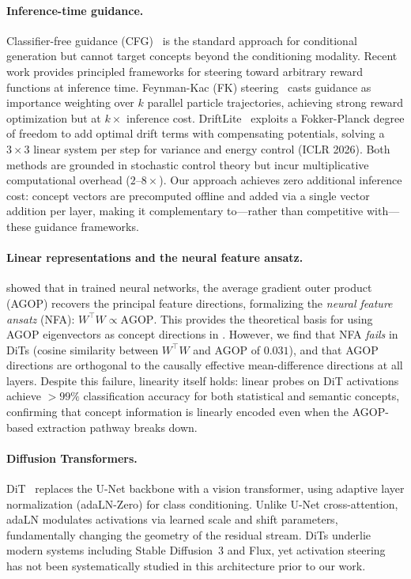 \documentclass{article}
\theoremstyle{definition}
\begin{document}
\paragraph{Inference-time guidance.}
Classifier-free guidance (CFG)~\citep{ho2022classifier} is the standard approach for conditional generation but cannot target concepts beyond the conditioning modality.
Recent work provides principled frameworks for steering toward arbitrary reward functions at inference time.
Feynman-Kac (FK) steering~\citep{phillips2025general} casts guidance as importance weighting over $k$ parallel particle trajectories, achieving strong reward optimization but at $k\times$ inference cost.
DriftLite~\citep{ren2026driftlite} exploits a Fokker-Planck degree of freedom to add optimal drift terms with compensating potentials, solving a $3\times 3$ linear system per step for variance and energy control (ICLR 2026).
Both methods are grounded in stochastic control theory but incur multiplicative computational overhead ($2$--$8\times$).
Our approach achieves zero additional inference cost: concept vectors are precomputed offline and added via a single vector addition per layer, making it complementary to---rather than competitive with---these guidance frameworks.

\paragraph{Linear representations and the neural feature ansatz.}
\citet{beaglehole2024average} showed that in trained neural networks, the average gradient outer product (AGOP) recovers the principal feature directions, formalizing the \emph{neural feature ansatz} (NFA): $W^\top W \propto \text{AGOP}$.
This provides the theoretical basis for using AGOP eigenvectors as concept directions in \citet{wang2026general}.
However, we find that NFA \emph{fails} in DiTs (cosine similarity between $W^\top W$ and AGOP of $0.031$), and that AGOP directions are orthogonal to the causally effective mean-difference directions at all layers.
Despite this failure, linearity itself holds: linear probes on DiT activations achieve $>99\%$ classification accuracy for both statistical and semantic concepts, confirming that concept information is linearly encoded even when the AGOP-based extraction pathway breaks down.

\paragraph{Diffusion Transformers.}
DiT~\citep{peebles2023scalable} replaces the U-Net backbone with a vision transformer, using adaptive layer normalization (adaLN-Zero) for class conditioning.
Unlike U-Net cross-attention, adaLN modulates activations via learned scale and shift parameters, fundamentally changing the geometry of the residual stream.
DiTs underlie modern systems including Stable Diffusion~3 and Flux, yet activation steering has not been systematically studied in this architecture prior to our work.
\end{document}
